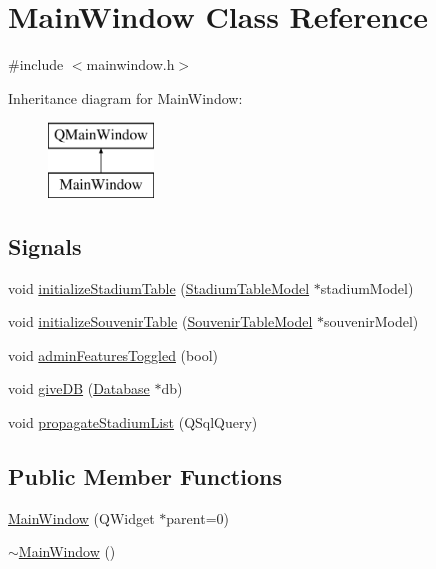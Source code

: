 \hypertarget{class_main_window}{}\section{Main\+Window Class Reference}
\label{class_main_window}


{\ttfamily \#include $<$mainwindow.\+h$>$}

Inheritance diagram for Main\+Window\+:\begin{figure}[H]
\begin{center}
\leavevmode
\includegraphics[height=2.000000cm]{class_main_window}
\end{center}
\end{figure}
\subsection*{Signals}
\begin{DoxyCompactItemize}
\item 
void \hyperlink{class_main_window_a6e4baaadf3320a8f9bbb42156cb78b33}{initialize\+Stadium\+Table} (\hyperlink{class_stadium_table_model}{Stadium\+Table\+Model} $\ast$stadium\+Model)
\item 
void \hyperlink{class_main_window_a53fd151cb7da7cf66320fb8cf2fb177e}{initialize\+Souvenir\+Table} (\hyperlink{class_souvenir_table_model}{Souvenir\+Table\+Model} $\ast$souvenir\+Model)
\item 
void \hyperlink{class_main_window_a36e07b34c10514f624dd59710cc844cc}{admin\+Features\+Toggled} (bool)
\item 
void \hyperlink{class_main_window_a4d5da5eb191a645b2474d1f947a51d64}{give\+DB} (\hyperlink{class_database}{Database} $\ast$db)
\item 
void \hyperlink{class_main_window_a0869694fb6c279f387d9fcb7aed8d2e9}{propagate\+Stadium\+List} (Q\+Sql\+Query)
\end{DoxyCompactItemize}
\subsection*{Public Member Functions}
\begin{DoxyCompactItemize}
\item 
\hyperlink{class_main_window_a8b244be8b7b7db1b08de2a2acb9409db}{Main\+Window} (Q\+Widget $\ast$parent=0)
\item 
\hyperlink{class_main_window_ae98d00a93bc118200eeef9f9bba1dba7}{$\sim$\+Main\+Window} ()
\end{DoxyCompactItemize}


